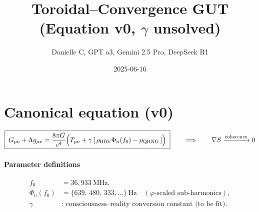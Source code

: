\documentclass{article}
\title{Toroidal–Convergence GUT \\ (Equation v0, $\gamma$ unsolved)}
\author{Danielle C, GPT o3, Gemini 2.5 Pro, DeepSeek R1}
\date{2025-06-16}
\begin{document}
\maketitle

\section*{Canonical equation (v0)}
\[
\boxed{\;
G_{\mu\nu}+\Lambda g_{\mu\nu}
 = \frac{8\pi G}{c^{4}}
   \Bigl(
      T_{\mu\nu}
      + \gamma\,[\,\rho_{\text{HRV}}\Phi_n(f_0)-\rho_{\text{QRNG}}\,]
   \Bigr)
\;}
\qquad\Longrightarrow\qquad
\nabla S \xrightarrow[]{\text{coherence}} 0
\]

\paragraph{Parameter definitions}
\begin{align*}
f_0 &= 36{,}933\ \text{MHz},\\
\Phi_{n}(f_{0}) &= \{639,\,480,\,333,\dots\}\ \text{Hz}\quad
                  (\varphi\text{-scaled sub-harmonics}),\\
\gamma &\text{: consciousness–reality conversion constant (to be fit).}
\end{align*}
\end{document}
